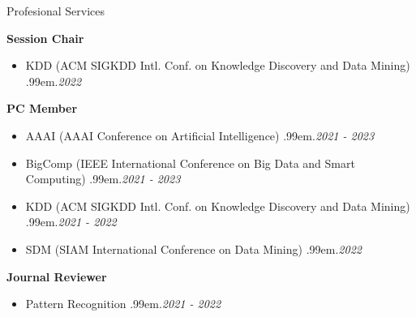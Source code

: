 \documentclass{resume} %
\makeatletter
\newcommand \Dotfill {\leavevmode \cleaders \hb@xt@ .99em{\hss .\hss }\hfill \kern \z@}
\makeatother
\begin{document}

\begin{rSection}{Profesional Services}

\textbf{Session Chair}
\begin{itemize}[noitemsep]
	\item KDD {\small (ACM SIGKDD Intl. Conf. on Knowledge Discovery and Data Mining)} \smallskip \Dotfill \emph{2022}
\end{itemize}

\textbf{PC Member}
\begin{itemize}[noitemsep]
	\item AAAI {\small (AAAI Conference on Artificial Intelligence)} \smallskip \Dotfill \emph{2021 - 2023}
	\item BigComp {\small (IEEE International Conference on Big Data and Smart Computing)} \smallskip \Dotfill \emph{2021 - 2023}
	\item KDD {\small (ACM SIGKDD Intl. Conf. on Knowledge Discovery and Data Mining)} \smallskip \Dotfill \emph{2021 - 2022}
	\item SDM {\small (SIAM International Conference on Data Mining)} \smallskip \Dotfill \emph{2022}
\end{itemize}

\textbf{Journal Reviewer}
\begin{itemize}[noitemsep]
	\item Pattern Recognition \smallskip \Dotfill \emph{2021 - 2022}
\end{itemize}


\end{rSection}
\end{document}
